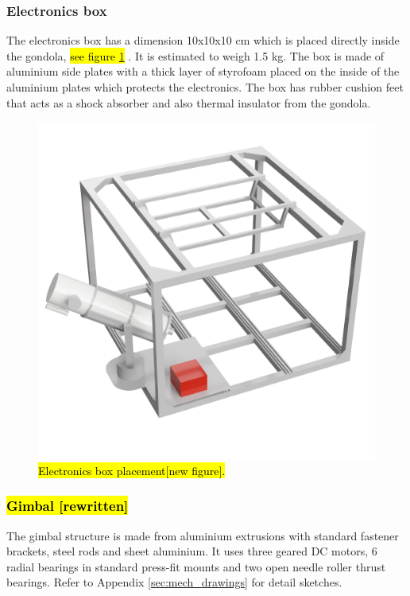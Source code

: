 \subsubsection{Electronics box}
\label{sec:4.4.2}


The electronics box has a dimension 10x10x10 cm which is placed directly inside the gondola, \hl{see figure {\ref{fig::mechanical::ebox}}} . It is estimated to weigh 1.5 kg. The box is made of aluminium side plates with a thick layer of styrofoam placed on the inside of the aluminium plates which protects the electronics. The box has rubber cushion feet that acts as a shock absorber and also thermal insulator from the gondola.

\begin{figure}[H]
	\centering 
	\includegraphics[scale=0.4]{4-experiment-design/img/mechanical/ebox.png}
	\caption{\hl{Electronics box placement[new figure].}}
	\label{fig::mechanical::ebox}
\end{figure}


\subsubsection{\hl{Gimbal [rewritten]}}
\label {sec:4.4.3}

The gimbal structure is made from aluminium extrusions with standard fastener brackets, steel rods and sheet aluminium. It uses three geared DC motors, 6 radial bearings in standard press-fit mounts and two open needle roller thrust bearings. Refer to Appendix  \ref{sec:mech_drawings} for detail sketches.

